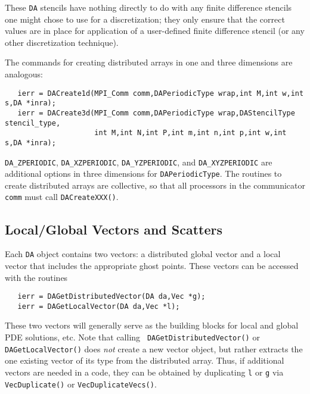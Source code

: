 These {\tt DA} stencils have nothing directly to do with any finite
difference stencils one might chose to use for a discretization; they
only ensure that the correct values are in place for application of a
user-defined finite difference stencil (or any other
discretization technique).

The commands for creating distributed arrays in one and three
dimensions are analogous:
\begin{verbatim}
   ierr = DACreate1d(MPI_Comm comm,DAPeriodicType wrap,int M,int w,int s,DA *inra);
   ierr = DACreate3d(MPI_Comm comm,DAPeriodicType wrap,DAStencilType stencil_type,
                     int M,int N,int P,int m,int n,int p,int w,int s,DA *inra);
\end{verbatim}
{\tt DA\_ZPERIODIC}, 
{\tt DA\_XZPERIODIC}, 
{\tt DA\_YZPERIODIC}, and 
{\tt DA\_XYZPERIODIC} 
are additional options in three dimensions for {\tt DAPeriodicType}.
The routines to create distributed arrays are collective, so that all
processors in the communicator {\tt comm} must call {\tt DACreateXXX()}.

\subsection{Local/Global Vectors and Scatters}

Each {\tt DA} object contains two vectors: a distributed global vector
and a local vector that includes the appropriate ghost points. These
vectors can be accessed 
with the routines 
\begin{verbatim}
   ierr = DAGetDistributedVector(DA da,Vec *g);
   ierr = DAGetLocalVector(DA da,Vec *l);
\end{verbatim}
These two vectors will generally serve as the building blocks for
local and global PDE solutions, etc.  Note that calling {\tt
DAGetDistributedVector()} or {\tt DAGetLocalVector()} does {\em not}
create a new vector object, but rather extracts the one existing
vector of its type from the distributed array.  Thus, if additional
vectors are needed in a code, they can be obtained by duplicating {\tt l}
or {\tt g} via {\tt VecDuplicate()} or {\tt VecDuplicateVecs()}.

